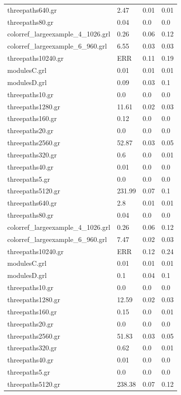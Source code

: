 \documentclass[11pt]{article}
\begin{document}
\begin{table}[h!]
\begin{tabularx}{\textwidth}{|l|X|X|X|}
		threepaths640.gr & 2.47 & 0.01 & 0.01 \\
		threepaths80.gr & 0.04 & 0.0 & 0.0 \\
		colorref\_largeexample\_4\_1026.grl & 0.26 & 0.06 & 0.12 \\
		colorref\_largeexample\_6\_960.grl & 6.55 & 0.03 & 0.03 \\
		threepaths10240.gr & ERR & 0.11 & 0.19 \\
		modulesC.grl & 0.01 & 0.01 & 0.01 \\
		modulesD.grl & 0.09 & 0.03 & 0.1 \\
		threepaths10.gr & 0.0 & 0.0 & 0.0 \\
		threepaths1280.gr & 11.61 & 0.02 & 0.03 \\
		threepaths160.gr & 0.12 & 0.0 & 0.0 \\
		threepaths20.gr & 0.0 & 0.0 & 0.0 \\
		threepaths2560.gr & 52.87 & 0.03 & 0.05 \\
		threepaths320.gr & 0.6 & 0.0 & 0.01 \\
		threepaths40.gr & 0.01 & 0.0 & 0.0 \\
		threepaths5.gr & 0.0 & 0.0 & 0.0 \\
		threepaths5120.gr & 231.99 & 0.07 & 0.1 \\
		threepaths640.gr & 2.8 & 0.01 & 0.01 \\
		threepaths80.gr & 0.04 & 0.0 & 0.0 \\
		colorref\_largeexample\_4\_1026.grl & 0.26 & 0.06 & 0.12 \\
		colorref\_largeexample\_6\_960.grl & 7.47 & 0.02 & 0.03 \\
		threepaths10240.gr & ERR & 0.12 & 0.24 \\
		modulesC.grl & 0.01 & 0.01 & 0.01 \\
		modulesD.grl & 0.1 & 0.04 & 0.1 \\
		threepaths10.gr & 0.0 & 0.0 & 0.0 \\
		threepaths1280.gr & 12.59 & 0.02 & 0.03 \\
		threepaths160.gr & 0.15 & 0.0 & 0.01 \\
		threepaths20.gr & 0.0 & 0.0 & 0.0 \\
		threepaths2560.gr & 51.83 & 0.03 & 0.05 \\
		threepaths320.gr & 0.62 & 0.0 & 0.01 \\
		threepaths40.gr & 0.01 & 0.0 & 0.0 \\
		threepaths5.gr & 0.0 & 0.0 & 0.0 \\
		threepaths5120.gr & 238.38 & 0.07 & 0.12 \\

\end{tabularx}
\end{table}
\end{document}

